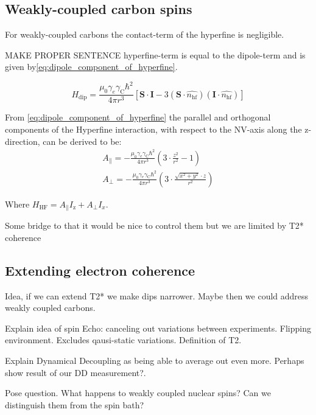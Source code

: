\subsection{Weakly-coupled carbon spins}

For weakly-coupled carbons the contact-term of the hyperfine is negligible.

MAKE PROPER SENTENCE
hyperfine-term is equal to the dipole-term and is given by\cref{eq:dipole_component_of_hyperfine}\citep{Lange2012Quantum}.

\begin{equation}
\label{eq:dipole_component_of_hyperfine}
H_{\mathrm{dip}} = \frac{\mu_0 \gamma_e \gamma_{\mathrm{C}} \hbar^2 }{4 \pi r^3} [ \bm{S \cdot I} - 3 (\bm S \cdot \hat{n_{\mathrm{hf}}})(\bm I \cdot \hat{n_{\mathrm{hf}}})]
\end{equation}

From \cref{eq:dipole_component_of_hyperfine}  the parallel and orthogonal components of the Hyperfine interaction, with respect to the NV-axis along the z-direction, can be derived to be:
 \begin{eqnarray}
A_\parallel= - \frac{\mu_0 \gamma_e \gamma_{\mathrm{C}} \hbar^2 }{4 \pi r^3} \left(3\cdot \frac{z^2}{r^2}-1\right)\\
 A_\perp =  -\frac{\mu_0 \gamma_e \gamma_{\mathrm{C}} \hbar^2 }{4 \pi r^3}\left( 3\cdot\frac{\sqrt{x^2+y^2}\cdot z}{r^2}\right)
\end{eqnarray}

Where $H_{\mathrm{HF}} = A_\parallel I_\mathrm{z} + A_\perp I_x $.

Some bridge to that it would be nice to control them but we are limited by T2* coherence

\subsection{Extending electron coherence}
Idea, if we can extend T2* we make dips narrower. Maybe then we could address weakly coupled carbons.

Explain idea of spin Echo: canceling out variations between experiments. Flipping environment. Excludes qausi-static variations.
Definition of T2.

Explain Dynamical Decoupling as being able to average out even more. Perhaps show result of our DD measurement?.

Pose question. What happens to weakly coupled nuclear spins? Can we distinguish them from the spin bath?

